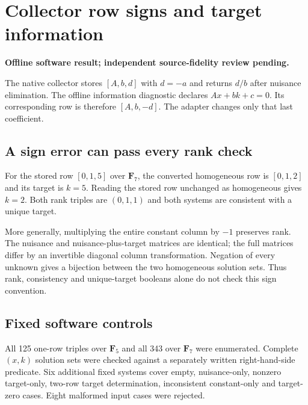 \documentclass[10pt]{article}
\begin{document}
\section*{Collector row signs and target information}
\textbf{Offline software result; independent source-fidelity review pending.}

The native collector stores $[A,b,d]$ with $d=-a$ and returns $d/b$ after nuisance elimination. The offline information diagnostic declares $Ax+bk+c=0$. Its corresponding row is therefore $[A,b,-d]$. The adapter changes only that last coefficient.
\begin{center}\end{center}
\subsection*{A sign error can pass every rank check}
For the stored row $[0,1,5]$ over $\mathbf F_7$, the converted homogeneous row is $[0,1,2]$ and its target is $k=5$. Reading the stored row unchanged as homogeneous gives $k=2$. Both rank triples are $(0,1,1)$ and both systems are consistent with a unique target.

More generally, multiplying the entire constant column by $-1$ preserves rank. The nuisance and nuisance-plus-target matrices are identical; the full matrices differ by an invertible diagonal column transformation. Negation of every unknown gives a bijection between the two homogeneous solution sets. Thus rank, consistency and unique-target booleans alone do not check this sign convention.
\subsection*{Fixed software controls}
All 125 one-row triples over $\mathbf F_5$ and all 343 over $\mathbf F_7$ were enumerated. Complete $(x,k)$ solution sets were checked against a separately written right-hand-side predicate. Six additional fixed systems cover empty, nuisance-only, nonzero target-only, two-row target determination, inconsistent constant-only and target-zero cases. Eight malformed input cases were rejected.
\end{document}
